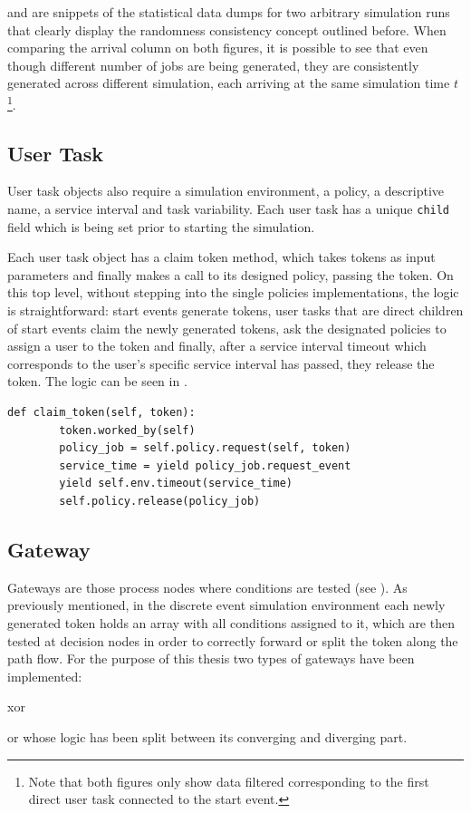  and  are snippets of the statistical data dumps for two arbitrary simulation runs that clearly display the randomness consistency concept outlined before. When comparing the arrival column on both figures, it is possible to see that even though different number of jobs are being generated, they are consistently generated across different simulation, each arriving at the same simulation time $t$\footnote{Note that both figures only show data filtered corresponding to the first direct user task connected to the start event.}.

\subsection{User Task}
\label{subsec:user_task}

User task objects also require a simulation environment, a policy, a descriptive name, a service interval and task variability. Each user task has a unique \texttt{child} field which is being set prior to starting the simulation.

Each user task object has a claim token method, which takes tokens as input parameters and finally makes a call to its designed policy, passing the token. On this top level, without stepping into the single policies implementations, the logic is straightforward: start events generate tokens, user tasks that are direct children of start events claim the newly generated tokens, ask the designated policies to assign a user to the token and finally, after a service interval timeout which corresponds to the user's specific service interval has passed, they release the token. The logic can be seen in .

\begin{lstlisting}[caption=User task claim method,label=lst:user_task,style=CustomPython]
    def claim_token(self, token):
        token.worked_by(self)
        policy_job = self.policy.request(self, token)
        service_time = yield policy_job.request_event
        yield self.env.timeout(service_time)
        self.policy.release(policy_job)
\end{lstlisting}

\subsection{Gateway}

Gateways are those process nodes where conditions are tested (see ). As previously mentioned, in the discrete event simulation environment each newly generated token holds an array with all conditions assigned to it, which are then tested at decision nodes in order to correctly forward or split the token along the path flow. For the purpose of this thesis two types of gateways have been implemented:
\begin{enumerate*}
     \item \gls{xor}
     \item \gls{or} whose logic has been split between its converging and diverging part.
 \end{enumerate*} 

